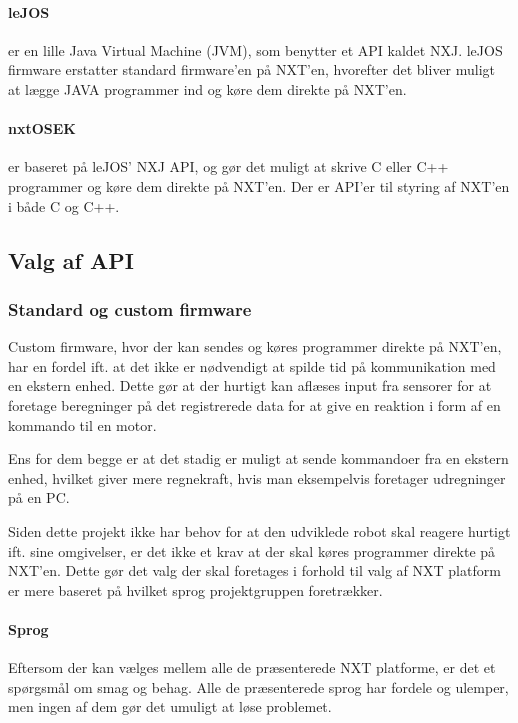 \paragraph{leJOS} er en lille Java Virtual Machine (JVM), som benytter et API kaldet NXJ.
leJOS firmware erstatter standard firmware'en på NXT'en, hvorefter det bliver muligt at lægge JAVA programmer ind og køre dem direkte på NXT'en. \cite{lejos}

\paragraph{nxtOSEK} er baseret på leJOS' NXJ API, og gør det muligt at skrive C eller C++ programmer og køre dem direkte på NXT'en.
Der er API'er til styring af NXT'en i både C og C++. \cite{nxtosek}

\subsection{Valg af API}

\subsubsection{Standard og custom firmware}
Custom firmware, hvor der kan sendes og køres programmer direkte på NXT'en, har en fordel ift. at det ikke er nødvendigt at spilde tid på kommunikation med en ekstern enhed.
Dette gør at der hurtigt kan aflæses input fra sensorer for at foretage beregninger på det registrerede data for at give en reaktion i form af en kommando til en motor.

Ens for dem begge er at det stadig er muligt at sende kommandoer fra en ekstern enhed, hvilket giver mere regnekraft, hvis man eksempelvis foretager udregninger på en PC.

Siden dette projekt ikke har behov for at den udviklede robot skal reagere hurtigt ift. sine omgivelser, er det ikke et krav at der skal køres programmer direkte på NXT'en.
Dette gør det valg der skal foretages i forhold til valg af NXT platform er mere baseret på hvilket sprog projektgruppen foretrækker.

\paragraph{Sprog}
Eftersom der kan vælges mellem alle de præsenterede NXT platforme, er det et spørgsmål om smag og behag.
Alle de præsenterede sprog har fordele og ulemper, men ingen af dem gør det umuligt at løse problemet.

